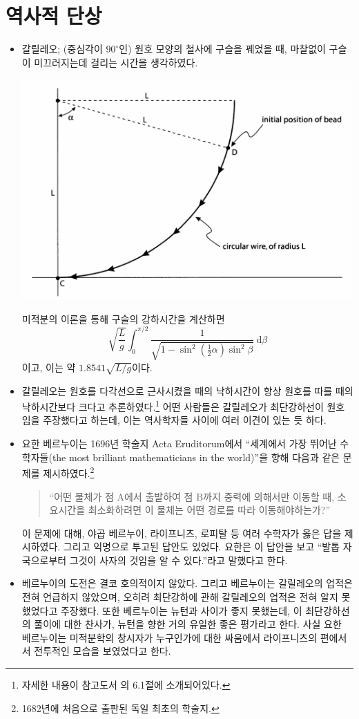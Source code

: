 

\section{역사적 단상}

\begin{itemize}
\item 갈릴레오; (중심각이 $90^\circ$인) 원호 모양의 철사에 구슬을 꿰었을 때, 마찰없이 구슬이 미끄러지는데 걸리는 시간을 생각하였다. 
\begin{center}
\includegraphics[width=.7\textwidth]{images/gal01}
\end{center}
미적분의 이론을 통해 구슬의 강하시간을 계산하면 
\[
\sqrt{\frac{L}{g}}\int_0^{\pi/2}\frac{1}{\sqrt{1-\sin^2\left(\frac{1}{2}\alpha\right)\sin^2\beta}}\ \mathrm{d}\beta
\]
이고, 이는 약 $1.8541\sqrt{L/g}$이다.

\item 갈릴레오는 원호를 다각선으로 근사시켰을 때의 낙하시간이 항상 원호를 따를 때의 낙하시간보다 크다고 추론하였다.\footnote{자세한 내용이 참고도서 \cite{PaulNahin}의 6.1절에 소개되어있다.} 어떤 사람들은 갈릴레오가 최단강하선이 원호임을 주장했다고 하는데, 이는 역사학자들 사이에 여러 이견이 있는 듯 하다.  
\item 요한 베르누이는 1696년 학술지 Acta Eruditorum에서 ``세계에서 가장 뛰어난 수학자들(the most brilliant mathematicians in the world)''을 향해 다음과 같은 문제를 제시하였다.\footnote{1682년에 처음으로 출판된 독일 최초의 학술지.}
\begin{quote}
``어떤 물체가 점 $\mathrm{A}$에서 출발하여 점 $\mathrm{B}$까지 중력에 의해서만 이동할 때, 소요시간을 최소화하려면 이 물체는 어떤 경로를 따라 이동해야하는가?''
\end{quote}
이 문제에 대해, 야곱 베르누이, 라이프니츠, 로피탈 등 여러 수학자가 옳은 답을 제시하였다. 그리고 익명으로 투고된 답안도 있었다. 요한은 이 답안을 보고 ``발톱 자국으로부터 그것이 사자의 것임을 알 수 있다.''라고 말했다고 한다.\cite{Wiki}
\item 베르누이의 도전은 결코 호의적이지 않았다. 그리고 베르누이는 갈릴레오의 업적은 전혀 언급하지 않았으며, 오히려 최단강하에 관해 갈릴레오의 업적은 전혀 알지 못했었다고 주장했다. 또한 베르누이는 뉴턴과 사이가 좋지 못했는데, 이 최단강하선의 풀이에 대한 찬사가, 뉴턴을 향한 거의 유일한 좋은 평가라고 한다.\cite{PaulNahin} 사실 요한 베르누이는 미적분학의 창시자가 누구인가에 대한 싸움에서 라이프니츠의 편에서서 전투적인 모습을 보였었다고 한다.\cite{William}
\end{itemize}

